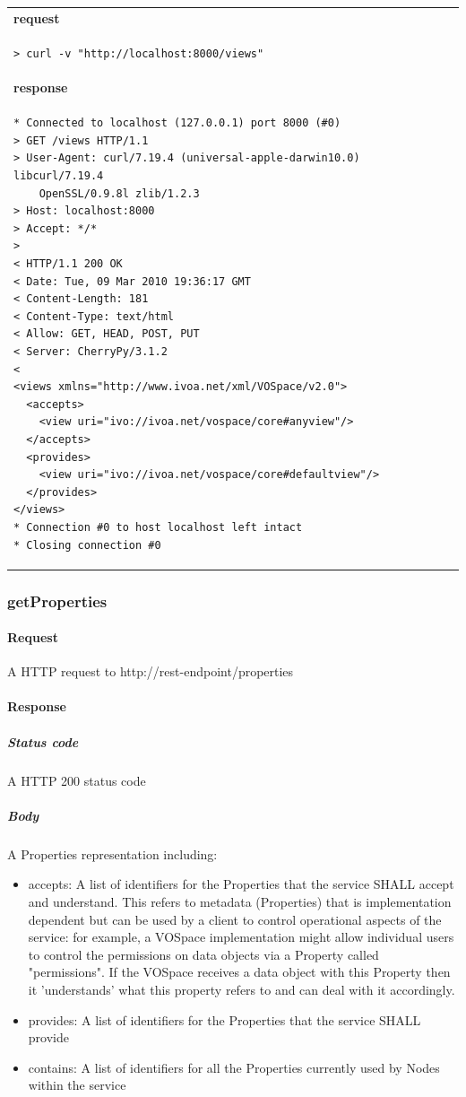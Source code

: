 \documentclass[11pt,a4paper]{ivoa}
\begin{document}
\begin{tabular}{ p{10cm} }
\\
\textbf{request} \\
\begin{lstlisting}
> curl -v "http://localhost:8000/views"
\end{lstlisting} \\
\textbf{response} \\
\begin{lstlisting}
* Connected to localhost (127.0.0.1) port 8000 (#0)
> GET /views HTTP/1.1
> User-Agent: curl/7.19.4 (universal-apple-darwin10.0) libcurl/7.19.4
    OpenSSL/0.9.8l zlib/1.2.3
> Host: localhost:8000
> Accept: */*
> 
< HTTP/1.1 200 OK
< Date: Tue, 09 Mar 2010 19:36:17 GMT
< Content-Length: 181
< Content-Type: text/html
< Allow: GET, HEAD, POST, PUT
< Server: CherryPy/3.1.2
< 
<views xmlns="http://www.ivoa.net/xml/VOSpace/v2.0">
  <accepts>
    <view uri="ivo://ivoa.net/vospace/core#anyview"/>
  </accepts>
  <provides>
    <view uri="ivo://ivoa.net/vospace/core#defaultview"/>
  </provides>
</views>
* Connection #0 to host localhost left intact
* Closing connection #0
\end{lstlisting}
\end{tabular}

\subsubsection{getProperties}

\paragraph{Request}
A HTTP request to http://rest-endpoint/properties

\paragraph{Response}
\subparagraph{Status code} A HTTP 200 status code
\subparagraph{Body}
A Properties representation including:
\begin{itemize}
    \item accepts: A list of identifiers for the Properties that the service SHALL accept and understand. This refers to metadata (Properties) that is implementation dependent but can be used by a client to control operational aspects of the service: for example, a VOSpace implementation might allow individual users to control the permissions on data objects via a Property called "permissions". If the VOSpace receives a data object with this Property then it 'understands' what this property refers to and can deal with it accordingly.
    \item provides: A list of identifiers for the Properties that the service SHALL provide
    \item contains: A list of identifiers for all the Properties currently used by Nodes within the service
\end{itemize}
\end{document}
